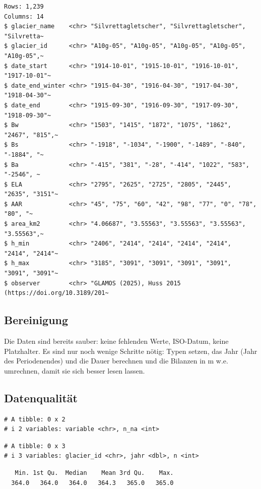\documentclass[
  nswissgerman,
  11pt,
  a4paper,
  DIV=11,
  numbers=noendperiod]{scrartcl}
\begin{document}
\begin{verbatim}
Rows: 1,239
Columns: 14
$ glacier_name    <chr> "Silvrettagletscher", "Silvrettagletscher", "Silvretta~
$ glacier_id      <chr> "A10g-05", "A10g-05", "A10g-05", "A10g-05", "A10g-05",~
$ date_start      <chr> "1914-10-01", "1915-10-01", "1916-10-01", "1917-10-01"~
$ date_end_winter <chr> "1915-04-30", "1916-04-30", "1917-04-30", "1918-04-30"~
$ date_end        <chr> "1915-09-30", "1916-09-30", "1917-09-30", "1918-09-30"~
$ Bw              <chr> "1503", "1415", "1872", "1075", "1862", "2467", "815",~
$ Bs              <chr> "-1918", "-1034", "-1900", "-1489", "-840", "-1884", "~
$ Ba              <chr> "-415", "381", "-28", "-414", "1022", "583", "-2546", ~
$ ELA             <chr> "2795", "2625", "2725", "2805", "2445", "2635", "3151"~
$ AAR             <chr> "45", "75", "60", "42", "98", "77", "0", "78", "80", "~
$ area_km2        <chr> "4.06687", "3.55563", "3.55563", "3.55563", "3.55563",~
$ h_min           <chr> "2406", "2414", "2414", "2414", "2414", "2414", "2414"~
$ h_max           <chr> "3185", "3091", "3091", "3091", "3091", "3091", "3091"~
$ observer        <chr> "GLAMOS (2025), Huss 2015 (https://doi.org/10.3189/201~
\end{verbatim}

\subsection{Bereinigung}\label{bereinigung}

Die Daten sind bereits sauber: keine fehlenden Werte, ISO-Datum, keine
Platzhalter. Es sind nur noch wenige Schritte nötig: Typen setzen, das
Jahr (Jahr des Periodenendes) und die Dauer berechnen und die Bilanzen
in m w.e. umrechnen, damit sie sich besser lesen lassen.

\subsection{Datenqualität}\label{datenqualituxe4t}

\begin{verbatim}
# A tibble: 0 x 2
# i 2 variables: variable <chr>, n_na <int>
\end{verbatim}

\begin{verbatim}
# A tibble: 0 x 3
# i 3 variables: glacier_id <chr>, jahr <dbl>, n <int>
\end{verbatim}

\begin{verbatim}
   Min. 1st Qu.  Median    Mean 3rd Qu.    Max. 
  364.0   364.0   364.0   364.3   365.0   365.0 
\end{verbatim}
\end{document}
